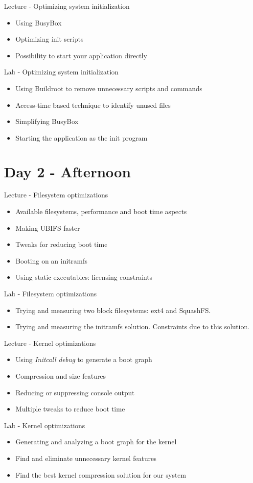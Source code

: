 \documentclass[a4paper,12pt,obeyspaces,spaces,hyphens]{article}
\begin{document}
\feagendatwocolumn
{Lecture - Optimizing system initialization}
{
  \begin{itemize}
  \item Using BusyBox 
  \item Optimizing init scripts
  \item Possibility to start your application directly
  \end{itemize}
}
{Lab - Optimizing system initialization}
{
 \begin{itemize}
 \item Using Buildroot to remove unnecessary scripts and commands
 \item Access-time based technique to identify  unused files
 \item Simplifying BusyBox
 \item Starting the application as the init program
 \end{itemize}
}

\section{Day 2 - Afternoon}

\feagendatwocolumn
{Lecture - Filesystem optimizations}
{
  \begin{itemize}
  \item Available filesystems, performance and boot time aspects
  \item Making UBIFS faster
  \item Tweaks for reducing boot time
  \item Booting on an initramfs
  \item Using static executables: licensing constraints
  \end{itemize}
}
{Lab - Filesystem optimizations}
{
 \begin{itemize}
 \item Trying and measuring two block filesystems: ext4 and SquashFS.
 \item Trying and measuring the initramfs solution. Constraints
       due to this solution.
 \end{itemize}
}

\feagendatwocolumn
{Lecture - Kernel optimizations}
{
  \begin{itemize}
  \item Using {\em Initcall debug} to generate a boot graph
  \item Compression and size features
  \item Reducing or suppressing console output
  \item Multiple tweaks to reduce boot time
  \end{itemize}
}
{Lab - Kernel optimizations}
{
 \begin{itemize}
 \item Generating and analyzing a boot graph for the kernel
 \item Find and eliminate unnecessary kernel features
 \item Find the best kernel compression solution for our system
 \end{itemize}
}
\end{document}

